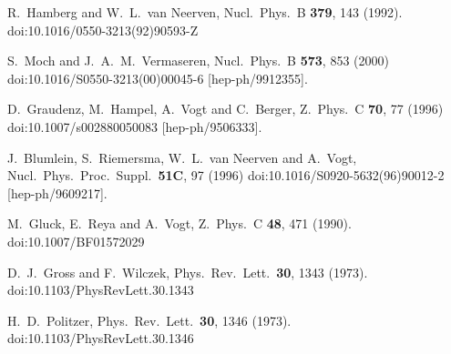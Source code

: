 \documentclass[review]{elsarticle}
\begin{document}
\begin{thebibliography}{}
  
  R.~Hamberg and W.~L.~van Neerven,
  Nucl.\ Phys.\ B {\bf 379}, 143 (1992).
  doi:10.1016/0550-3213(92)90593-Z




  S.~Moch and J.~A.~M.~Vermaseren,
  Nucl.\ Phys.\ B {\bf 573}, 853 (2000)
  doi:10.1016/S0550-3213(00)00045-6
  [hep-ph/9912355].
  

  

  D.~Graudenz, M.~Hampel, A.~Vogt and C.~Berger,
  Z.\ Phys.\ C {\bf 70}, 77 (1996)
  doi:10.1007/s002880050083
  [hep-ph/9506333].

    J.~Blumlein, S.~Riemersma, W.~L.~van Neerven and A.~Vogt,
    Nucl.\ Phys.\ Proc.\ Suppl.\  {\bf 51C}, 97 (1996)
    doi:10.1016/S0920-5632(96)90012-2
    [hep-ph/9609217].
  
  
    M.~Gluck, E.~Reya and A.~Vogt,
    Z.\ Phys.\ C {\bf 48}, 471 (1990).
    doi:10.1007/BF01572029


  D.~J.~Gross and F.~Wilczek,
  Phys.\ Rev.\ Lett.\  {\bf 30}, 1343 (1973).
  doi:10.1103/PhysRevLett.30.1343


  H.~D.~Politzer,
  Phys.\ Rev.\ Lett.\  {\bf 30}, 1346 (1973).
  doi:10.1103/PhysRevLett.30.1346



\end{thebibliography}
\end{document}

